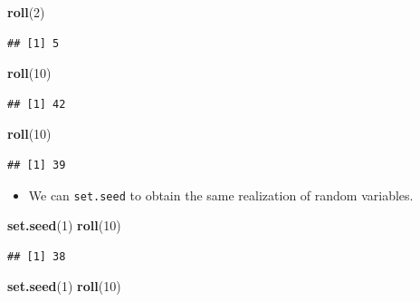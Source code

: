 \documentclass[]{book}
\newenvironment{Shaded}{\begin{snugshade}}{\end{snugshade}}
\newcommand{\KeywordTok}[1]{\textcolor[rgb]{0.13,0.29,0.53}{\textbf{#1}}}
\newcommand{\DecValTok}[1]{\textcolor[rgb]{0.00,0.00,0.81}{#1}}
\newcommand{\NormalTok}[1]{#1}
\providecommand{\tightlist}{%
  \setlength{\itemsep}{0pt}\setlength{\parskip}{0pt}}
\begin{document}
\begin{Shaded}
\begin{Highlighting}[]
\KeywordTok{roll}\NormalTok{(}\DecValTok{2}\NormalTok{)}
\end{Highlighting}
\end{Shaded}

\begin{verbatim}
## [1] 5
\end{verbatim}

\begin{Shaded}
\begin{Highlighting}[]
\KeywordTok{roll}\NormalTok{(}\DecValTok{10}\NormalTok{)}
\end{Highlighting}
\end{Shaded}

\begin{verbatim}
## [1] 42
\end{verbatim}

\begin{Shaded}
\begin{Highlighting}[]
\KeywordTok{roll}\NormalTok{(}\DecValTok{10}\NormalTok{)}
\end{Highlighting}
\end{Shaded}

\begin{verbatim}
## [1] 39
\end{verbatim}

\begin{itemize}
\tightlist
\item
  We can \texttt{set.seed} to obtain the same realization of random
  variables.
\end{itemize}

\begin{Shaded}
\begin{Highlighting}[]
\KeywordTok{set.seed}\NormalTok{(}\DecValTok{1}\NormalTok{)}
\KeywordTok{roll}\NormalTok{(}\DecValTok{10}\NormalTok{)}
\end{Highlighting}
\end{Shaded}

\begin{verbatim}
## [1] 38
\end{verbatim}

\begin{Shaded}
\begin{Highlighting}[]
\KeywordTok{set.seed}\NormalTok{(}\DecValTok{1}\NormalTok{)}
\KeywordTok{roll}\NormalTok{(}\DecValTok{10}\NormalTok{)}
\end{Highlighting}
\end{Shaded}
\end{document}
